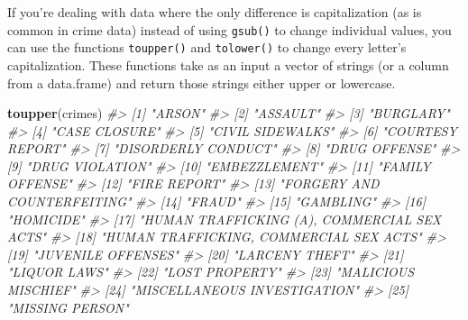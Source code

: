 \documentclass[
  12pt,
]{book}
\newenvironment{Shaded}{\begin{snugshade}}{\end{snugshade}}
\newcommand{\CommentTok}[1]{\textcolor[rgb]{0.37,0.37,0.37}{\textit{#1}}}
\newcommand{\KeywordTok}[1]{\textcolor[rgb]{0.27,0.27,0.27}{\textbf{#1}}}
\newcommand{\NormalTok}[1]{#1}
\begin{document}
If you're dealing with data where the only difference is capitalization (as is common in crime data) instead of using \texttt{gsub()} to change individual values, you can use the functions \texttt{toupper()} and \texttt{tolower()} to change every letter's capitalization. These functions take as an input a vector of strings (or a column from a data.frame) and return those strings either upper or lowercase.

\begin{Shaded}
\begin{Highlighting}[]
\KeywordTok{toupper}\NormalTok{(crimes)}
\CommentTok{\#\textgreater{}  [1] "ARSON"                                     }
\CommentTok{\#\textgreater{}  [2] "ASSAULT"                                   }
\CommentTok{\#\textgreater{}  [3] "BURGLARY"                                  }
\CommentTok{\#\textgreater{}  [4] "CASE CLOSURE"                              }
\CommentTok{\#\textgreater{}  [5] "CIVIL SIDEWALKS"                           }
\CommentTok{\#\textgreater{}  [6] "COURTESY REPORT"                           }
\CommentTok{\#\textgreater{}  [7] "DISORDERLY CONDUCT"                        }
\CommentTok{\#\textgreater{}  [8] "DRUG OFFENSE"                              }
\CommentTok{\#\textgreater{}  [9] "DRUG VIOLATION"                            }
\CommentTok{\#\textgreater{} [10] "EMBEZZLEMENT"                              }
\CommentTok{\#\textgreater{} [11] "FAMILY OFFENSE"                            }
\CommentTok{\#\textgreater{} [12] "FIRE REPORT"                               }
\CommentTok{\#\textgreater{} [13] "FORGERY AND COUNTERFEITING"                }
\CommentTok{\#\textgreater{} [14] "FRAUD"                                     }
\CommentTok{\#\textgreater{} [15] "GAMBLING"                                  }
\CommentTok{\#\textgreater{} [16] "HOMICIDE"                                  }
\CommentTok{\#\textgreater{} [17] "HUMAN TRAFFICKING (A), COMMERCIAL SEX ACTS"}
\CommentTok{\#\textgreater{} [18] "HUMAN TRAFFICKING, COMMERCIAL SEX ACTS"    }
\CommentTok{\#\textgreater{} [19] "JUVENILE OFFENSES"                         }
\CommentTok{\#\textgreater{} [20] "LARCENY THEFT"                             }
\CommentTok{\#\textgreater{} [21] "LIQUOR LAWS"                               }
\CommentTok{\#\textgreater{} [22] "LOST PROPERTY"                             }
\CommentTok{\#\textgreater{} [23] "MALICIOUS MISCHIEF"                        }
\CommentTok{\#\textgreater{} [24] "MISCELLANEOUS INVESTIGATION"               }
\CommentTok{\#\textgreater{} [25] "MISSING PERSON"                            }

\end{Highlighting}
\end{Shaded}
\end{document}
